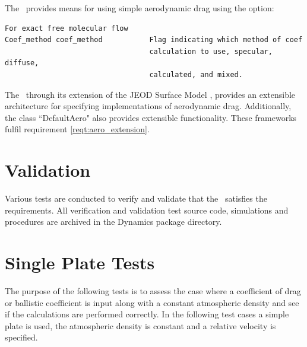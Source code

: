 \label{inspect:FMF}
The \aerodynamicsDesc\ provides means for
using simple aerodynamic drag using the option:
\begin{verbatim}
For exact free molecular flow
Coef_method coef_method           Flag indicating which method of coef
                                  calculation to use, specular, diffuse,
                                  calculated, and mixed.
\end{verbatim}

\label{inspect:aero_extension}
The \aerodynamicsDesc\, through its extension of the JEOD Surface Model
\cite{dynenv:SURFACEMODEL}, provides an extensible architecture
for specifying implementations of aerodynamic drag.
Additionally, the class ``DefaultAero" also provides extensible
functionality. These frameworks fulfil requirement \ref{reqt:aero_extension}.

\section{Validation}
Various tests are conducted to verify and validate
that the \aerodynamicsDesc\ satisfies the requirements.  All verification and validation
test source code, simulations and procedures are archived in the
Dynamics package directory.
\section {Single Plate Tests}
The purpose of the following tests is to assess the case where a
coefficient of drag or ballistic coefficient is input along with a
constant atmospheric density and see if the calculations are
performed correctly. In the following test cases a simple plate is
used, the atmospheric density is constant and a relative velocity
is specified.

